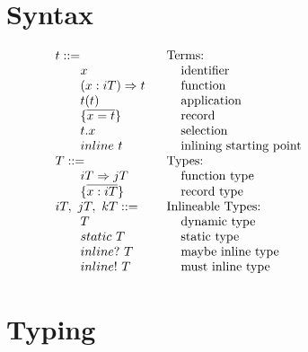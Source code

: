 \documentclass[paper.tex]{subfiles}
\begin{document}
\section{Syntax}
\begin{figure}[H]
\begin{center}$
\begin{array}{l@{\hspace{0.2mm}}}
\begin{array}{l@{\hspace{10mm}}l}

  t ::=                     & \lindent{\mbox{Terms:}}            \\
  \gap x                    & \mbox{identifier}                  \\
  \gap (x: \i{T}) \ra t     & \mbox{function}                    \\
  \gap t(t)                 & \mbox{application}                 \\
  \gap \{ \seq{x = t} \}    & \mbox{record}                      \\
  \gap t.x                  & \mbox{selection}                   \\
  \gap \ct t                & \mbox{inlining starting point}     \\

  T ::=                     & \lindent{\mbox{Types:}}            \\
  \gap \i{T} \ra \j{T}      & \mbox{function type}               \\
  \gap \{ \seq{x: \i{T}} \} & \mbox{record type}                 \\

  \i{T},\ \j{T},\ \k{T} ::= & \lindent{\mbox{Inlineable Types:}} \\ 
  \gap T                    & \mbox{dynamic type}                \\
  \gap \static{T}           & \mbox{static type}                 \\
  \gap \mayInline{T}        & \mbox{maybe inline type}           \\
  \gap \inline{T}           & \mbox{must inline type}            \\

\end{array}
\end{array}
$\end{center}
\caption{}
\end{figure}

\section{Typing}
\end{document}
